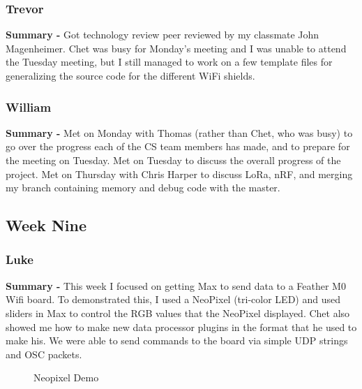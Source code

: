 \documentclass[onecolumn, draftclsnofoot,10pt, compsoc]{IEEEtran}
\begin{document}
\subsubsection*{Trevor}
    \begin{adjustwidth}{2.5em}{0pt}
    \textbf{Summary -} Got technology review peer reviewed by my classmate John Magenheimer. Chet was busy for Monday's meeting and I was unable to attend the Tuesday meeting, but I still managed to work on a few template files for generalizing the source code for the different WiFi shields.
    \end{adjustwidth}
\subsubsection*{William}
    \begin{adjustwidth}{2.5em}{0pt}
    \textbf{Summary -} Met on Monday with Thomas (rather than Chet, who was busy) to go over the progress each of the CS team members has made, and to prepare for the meeting on Tuesday. Met on Tuesday to discuss the overall progress of the project. Met on Thursday with Chris Harper to discuss LoRa, nRF, and merging my branch containing memory and debug code with the master.
    \end{adjustwidth}



\subsection{Week Nine}
\subsubsection*{Luke}
    \begin{adjustwidth}{2.5em}{0pt}
    \textbf{Summary -} This week I focused on getting Max to send data to a Feather M0 Wifi board. To demonstrated this, I used a NeoPixel (tri-color LED) and used sliders in Max to control the RGB values that the NeoPixel displayed. Chet also showed me how to make new data processor plugins in the format that he used to make his. We were able to send commands to the board via simple UDP strings and OSC packets. 
    \end{adjustwidth} 

    \begin{figure}[H]
        \centering
        \caption{Neopixel Demo}
        \label{fig:neopixel_demo}
        \qquad
    \end{figure}
\end{document}

